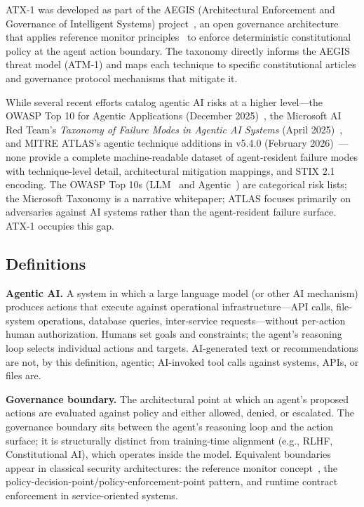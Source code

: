 \documentclass{IEEEoj-data}
\newcommand{\replaced}[2]{#1}
\newcommand{\added}[1]{#1}
\begin{document}
ATX-1 was developed as part of the AEGIS (Architectural Enforcement and Governance of Intelligent Systems) project~\cite{ref5}, an open governance architecture that applies reference monitor principles~\cite{ref14} to enforce deterministic constitutional policy at the agent action boundary. The taxonomy directly informs the AEGIS threat model (ATM-1) and maps each technique to specific constitutional articles and governance protocol mechanisms that mitigate it.

\replaced{While several recent efforts catalog agentic AI risks at a higher level---the OWASP Top 10 for Agentic Applications (December 2025)~\mbox{\cite{ref30}}, the Microsoft AI Red Team's {\it Taxonomy of Failure Modes in Agentic AI Systems} (April 2025)~\mbox{\cite{ref17}}, and MITRE ATLAS's agentic technique additions in v5.4.0 (February 2026)~\mbox{\cite{ref3}}---none provide a complete machine-readable dataset of agent-resident failure modes with technique-level detail, architectural mitigation mappings, and STIX 2.1 encoding. The OWASP Top 10s (LLM~\mbox{\cite{ref6}} and Agentic~\mbox{\cite{ref30}}) are categorical risk lists; the Microsoft Taxonomy is a narrative whitepaper; ATLAS focuses primarily on adversaries against AI systems rather than the agent-resident failure surface. ATX-1 occupies this gap.}{No comparable machine-readable dataset exists for agentic AI threat modeling. The OWASP Top 10 for LLM Applications~\mbox{\cite{ref6}} provides a high-level risk categorization but does not define individual techniques, map mitigations to architectural mechanisms, or provide STIX-compatible data for integration with threat intelligence platforms. ATX-1 fills this gap.}

\subsection*{\added{Definitions}}

\added{{\bf Agentic AI.} A system in which a large language model (or other AI mechanism) produces actions that execute against operational infrastructure---API calls, file-system operations, database queries, inter-service requests---without per-action human authorization. Humans set goals and constraints; the agent's reasoning loop selects individual actions and targets. AI-generated text or recommendations are not, by this definition, agentic; AI-invoked tool calls against systems, APIs, or files are.}

\added{{\bf Governance boundary.} The architectural point at which an agent's proposed actions are evaluated against policy and either allowed, denied, or escalated. The governance boundary sits between the agent's reasoning loop and the action surface; it is structurally distinct from training-time alignment (e.g., RLHF, Constitutional AI), which operates inside the model. Equivalent boundaries appear in classical security architectures: the reference monitor concept~\mbox{\cite{ref10}}, the policy-decision-point/policy-enforcement-point pattern, and runtime contract enforcement in service-oriented systems.}
\end{document}
